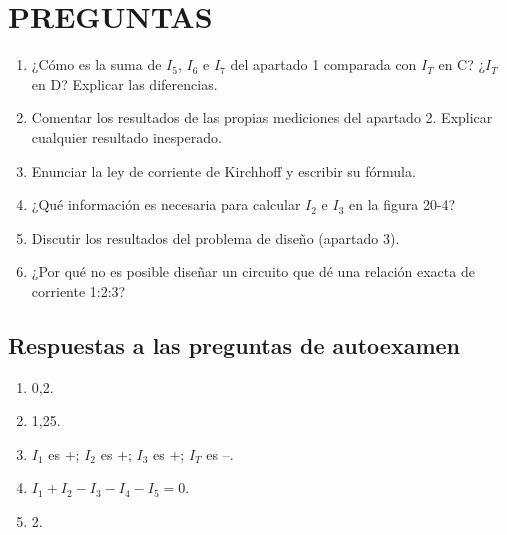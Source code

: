 \documentclass[12pt, a4paper]{article}
\begin{document}
\section*{PREGUNTAS}
\begin{enumerate}[label=\arabic*., start=2]
    \item ¿Cómo es la suma de $I_5$, $I_6$ e $I_7$ del apartado 1 comparada con $I_T$ en C? ¿$I_T$ en D? Explicar las diferencias.
    \item Comentar los resultados de las propias mediciones del apartado 2. Explicar cualquier resultado inesperado.
    \item Enunciar la ley de corriente de Kirchhoff y escribir su fórmula.
    \item ¿Qué información es necesaria para calcular $I_2$ e $I_3$ en la figura 20-4?
    \item Discutir los resultados del problema de diseño (apartado 3).
    \item ¿Por qué no es posible diseñar un circuito que dé una relación exacta de corriente 1:2:3?
\end{enumerate}

\subsection*{Respuestas a las preguntas de autoexamen}
\begin{enumerate}[label=\arabic*.]
    \item 0,2.
    \item 1,25.
    \item $I_1$ es +; $I_2$ es +; $I_3$ es +; $I_T$ es –.
    \item $I_1 + I_2 - I_3 - I_4 - I_5 = 0$.
    \item 2.
\end{enumerate}
\end{document}
